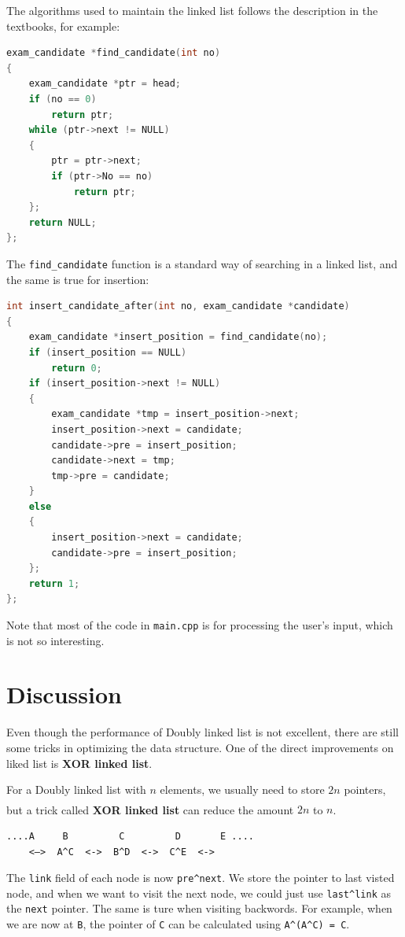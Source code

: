\documentclass[cn,black,12pt,normal]{elegantnote}
\newcommand{\uct}[1]{\textsuperscript{\textsuperscript{\cite{#1}}}}
\begin{document}
The algorithms used to maintain the linked list follows the description in the textbooks, for example:
\begin{lstlisting}[language = C++]
exam_candidate *find_candidate(int no)
{
	exam_candidate *ptr = head;
	if (no == 0)
		return ptr;
	while (ptr->next != NULL)
	{
		ptr = ptr->next;
		if (ptr->No == no)
			return ptr;
	};
	return NULL;
};
\end{lstlisting}
The \lstinline{find_candidate} function is a standard way of searching in a linked list, and the same is true for insertion:
\begin{lstlisting}[language = C++]
int insert_candidate_after(int no, exam_candidate *candidate)
{
	exam_candidate *insert_position = find_candidate(no);
	if (insert_position == NULL)
		return 0;
	if (insert_position->next != NULL)
	{
		exam_candidate *tmp = insert_position->next;
		insert_position->next = candidate;
		candidate->pre = insert_position;
		candidate->next = tmp;
		tmp->pre = candidate;
	}
	else
	{
		insert_position->next = candidate;
		candidate->pre = insert_position;
	};
	return 1;
};
\end{lstlisting}

Note that most of the code in \lstinline{main.cpp} is for processing the user's input, which is not so interesting.

\section{Discussion}

Even though the performance of Doubly linked list is not excellent, there are still some tricks in optimizing the data structure. One of the direct improvements on liked list is \textbf{XOR linked list}.

For a Doubly linked list with $n$ elements, we usually need to store $2n$ pointers, but a trick called \textbf{XOR linked list} can reduce the amount $2n$ to $n$. \uct{lewin2012all}

\begin{lstlisting}
....A     B         C         D       E ....
    <–>  A^C  <->  B^D  <->  C^E  <->
\end{lstlisting}
The \lstinline{link} field of each node is now \lstinline{pre^next}. We store the pointer to last visted node, and when we want to visit the next node, we could just use \lstinline{last^link} as the \lstinline{next} pointer. The same is ture when visiting backwords.
For example, when we are now at \lstinline{B}, the pointer of \lstinline{C} can be calculated using \lstinline{A^(A^C) = C}.


\end{document}
